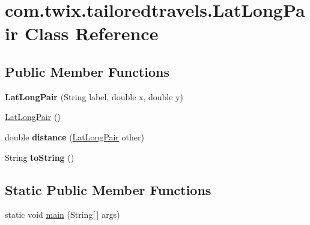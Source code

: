 \hypertarget{classcom_1_1twix_1_1tailoredtravels_1_1_lat_long_pair}{\section{com.\-twix.\-tailoredtravels.\-Lat\-Long\-Pair Class Reference}
\label{classcom_1_1twix_1_1tailoredtravels_1_1_lat_long_pair}
}
\subsection*{Public Member Functions}
\begin{DoxyCompactItemize}
\item 
\hypertarget{classcom_1_1twix_1_1tailoredtravels_1_1_lat_long_pair_a954bc334e0655d6aba61889148763c59}{{\bfseries Lat\-Long\-Pair} (String label, double x, double y)}\label{classcom_1_1twix_1_1tailoredtravels_1_1_lat_long_pair_a954bc334e0655d6aba61889148763c59}

\item 
\hyperlink{classcom_1_1twix_1_1tailoredtravels_1_1_lat_long_pair_a31d06b625d306f8c9fec890088e057e8}{Lat\-Long\-Pair} ()
\item 
\hypertarget{classcom_1_1twix_1_1tailoredtravels_1_1_lat_long_pair_afe76298eaa3ba7818803b3cbabbbba7c}{double {\bfseries distance} (\hyperlink{classcom_1_1twix_1_1tailoredtravels_1_1_lat_long_pair}{Lat\-Long\-Pair} other)}\label{classcom_1_1twix_1_1tailoredtravels_1_1_lat_long_pair_afe76298eaa3ba7818803b3cbabbbba7c}

\item 
\hypertarget{classcom_1_1twix_1_1tailoredtravels_1_1_lat_long_pair_a525ff91d655b14072016deec5b5d78aa}{String {\bfseries to\-String} ()}\label{classcom_1_1twix_1_1tailoredtravels_1_1_lat_long_pair_a525ff91d655b14072016deec5b5d78aa}

\end{DoxyCompactItemize}
\subsection*{Static Public Member Functions}
\begin{DoxyCompactItemize}
\item 
static void \hyperlink{classcom_1_1twix_1_1tailoredtravels_1_1_lat_long_pair_afb325ba5da71762d52a02d9c0a2af44f}{main} (String\mbox{[}$\,$\mbox{]} args)
\end{DoxyCompactItemize}
